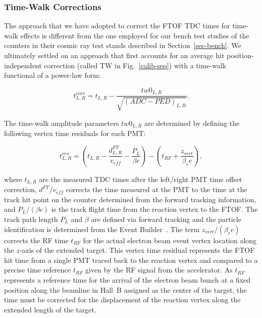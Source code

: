 \documentclass[3p,times,twocolumn]{elsarticle}
\begin{document}
\subsubsection{Time-Walk Corrections}
\label{sec-tw}

The approach that we have adopted to correct the FTOF TDC times for time-walk effects is different from
the one employed for our bench test studies of the counters in their cosmic ray test stands described in
Section~\ref{sec-bench}. We ultimately settled on an approach that first accounts for an average hit
position-independent correction (called TW in Fig.~\ref{calib-seq}) with a time-walk functional of a
power-law form:

\begin{equation}
\label{tw-func}
t^{corr}_{L,R} = t_{L,R} - \frac{tw0_{L,R}}{\sqrt{(ADC - PED)_{L,R}}}.
\end{equation}

The time-walk amplitude parameters $tw0_{L,R}$ are determined by defining the following vertex time
residuals for each PMT:

\begin{equation}
\label{tres}
t_{L,R}^{res} = \left(t_{L,R} - \frac{d_{L,R}^{FT}}{v_{eff}} - \frac{P_L}{\beta c} \right) 
- \left( t_{RF} + \frac{z_{vert}}{\beta_e c} \right),
\end{equation}

\noindent
where $t_{L,R}$ are the measured TDC times after the left/right PMT time offset correction, $d^{FT}/v_{eff}$
corrects the time measured at the PMT to the time at the track hit point on the counter determined from the
forward tracking information, and $P_L/(\beta c)$ is the track flight time from the reaction vertex to the
FTOF. The track path length $P_L$ and $\beta$ are defined via forward tracking and the particle identification
is determined from the Event Builder~\cite{daq-nim}. The term $z_{vert}/(\beta_e c)$ corrects the RF time
$t_{RF}$ for the actual electron beam event vertex location along the $z$-axis of the extended target. This
vertex time residual represents the FTOF hit time from a single PMT traced back to the reaction vertex and
compared to a precise time reference $t_{RF}$ given by the RF signal from the accelerator. As $t_{RF}$
represents a reference time for the arrival of the electron beam bunch at a fixed position along the beamline in
Hall~B assigned as the center of the target, the time must be corrected for the displacement of the reaction
vertex along the extended length of the target.
\end{document}
